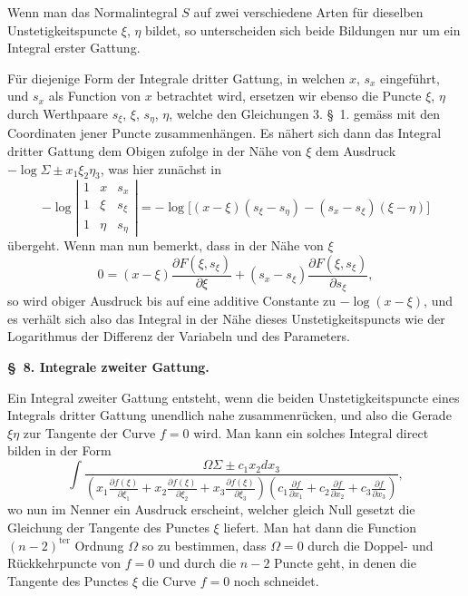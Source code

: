 \documentclass[10pt]{article}
\begin{document}
Wenn man das Normalintegral $S$ auf zwei verschiedene Arten für dieselben Unstetigkeitspuncte $\xi$, $\eta$ bildet, so unterscheiden sich beide Bildungen nur um ein Integral erster Gattung.

Für diejenige Form der Integrale dritter Gattung, in welchen $x$, $s_x$ eingeführt, und $s_x$ als Function von $x$ betrachtet wird, ersetzen wir ebenso die Puncte $\xi$, $\eta$ durch Werthpaare $s_\xi$, $\xi$, $s_\eta$, $\eta$, welche den Gleichungen 3. \S\ 1. gemäss mit den Coordinaten jener Puncte zusammenhängen. Es nähert sich dann das Integral dritter Gattung dem Obigen zufolge in der Nähe von $\xi$ dem Ausdruck $-\log\Sigma\pm x_1\xi_2\eta_3$, was hier zunächst in
\[
-\log\left|
\begin{array}{ccc}
1&x&s_x\\
1&\xi&s_\xi\\
1&\eta&s_\eta
\end{array}
\right|
=-\log\bigl[(x-\xi)(s_\xi-s_\eta)-(s_x-s_\xi)(\xi-\eta)\bigr]
\]
übergeht. Wenn man nun bemerkt, dass in der Nähe von $\xi$
\[
0=(x-\xi)\frac{\partial F(\xi,s_\xi)}{\partial \xi}+(s_x-s_\xi)\frac{\partial F(\xi,s_\xi)}{\partial s_\xi},
\]
so wird obiger Ausdruck bis auf eine additive Constante zu $-\log(x-\xi)$, und es verhält sich also das Integral in der Nähe dieses Unstetigkeitspuncts wie der Logarithmus der Differenz der Variabeln und des Parameters.

\begin{center}
{\bfseries \S\ 8. Integrale zweiter Gattung.}
\end{center}

Ein Integral zweiter Gattung entsteht, wenn die beiden Unstetigkeitspuncte eines Integrals dritter Gattung unendlich nahe zusammenrücken, und also die Gerade $\xi\eta$ zur Tangente der Curve $f=0$ wird. Man kann ein solches Integral direct bilden in der Form
\[
\int
\frac{\Omega\Sigma\pm c_1x_2dx_3}{\left(x_1\frac{\partial f(\xi)}{\partial \xi_1}+x_2\frac{\partial f(\xi)}{\partial \xi_2}+x_3\frac{\partial f(\xi)}{\partial \xi_3}\right)
\left(c_1\frac{\partial f}{\partial x_1}+c_2\frac{\partial f}{\partial x_2}+c_3\frac{\partial f}{\partial x_3}\right)},
\]
wo nun im Nenner ein Ausdruck erscheint, welcher gleich Null gesetzt die Gleichung der Tangente des Punctes $\xi$ liefert. Man hat dann die Function $(n-2)^{\mathrm{ter}}$ Ordnung $\Omega$ so zu bestimmen, dass $\Omega=0$ durch die Doppel- und Rückkehrpuncte von $f=0$ und durch die $n-2$ Puncte geht, in denen die Tangente des Punctes $\xi$ die Curve $f=0$ noch schneidet.
\end{document}
